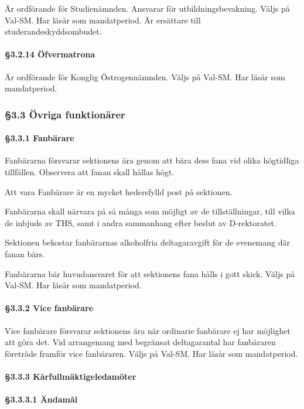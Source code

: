 Är ordförande för Studienämnden. Ansvarar för utbildningsbevakning. Väljs på Val-SM. Har läsår som mandatperiod. Är ersättare till studerandeskyddsombudet.

\paragraph{§3.2.14 Öfvermatrona}

Är ordförande för Konglig Östrogennämnden. Väljs på Val-SM. Har läsår som
mandatperiod.

\subsubsection{§3.3 Övriga funktionärer}

\paragraph{§3.3.1 Fanbärare}

Fanbärarna försvarar sektionens ära genom att bära dess fana vid olika högtidliga tillfällen. Observera att fanan skall hållas högt.

Att vara Fanbärare är en mycket hedersfylld post på sektionen.

Fanbärarna skall närvara på så många som möjligt av de tillställningar, till vilka de inbjuds av THS, samt i andra sammanhang efter beslut av D-rektoratet.

Sektionen bekostar fanbärarnas alkoholfria deltagaravgift för de evenemang där fanan bärs.

Fanbärarna bär huvudansvaret för att sektionens fana hålls i gott skick. Väljs på Val-SM. Har läsår som mandatperiod.

\paragraph{§3.3.2 Vice fanbärare}

Vice fanbärare försvarar sektionens ära när ordinarie fanbärare ej har möjlighet att göra det. Vid arrangemang med begränsat deltagarantal har fanbäraren företräde framför vice fanbäraren. Väljs på Val-SM. Har läsår som mandatperiod.

\paragraph{§3.3.3 Kårfullmäktigeledamöter}

\paragraph{§3.3.3.1 Ändamål}

